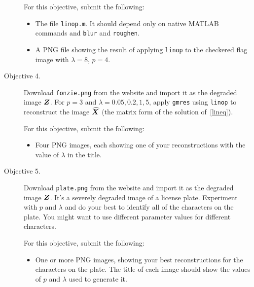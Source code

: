 \documentclass[11pt,letterpaper]{article}
\begin{document}
\begin{description}
For this objective, submit the following:
\begin{itemize}
\item The file \texttt{linop.m}. It should depend only on native MATLAB commands and \texttt{blur} and \texttt{roughen}.
\item A PNG file showing the result of applying \texttt{linop} to the checkered flag image with $\lambda=8$, $p=4$.
\end{itemize}

\item[{Objective 4.}] Download \texttt{fonzie.png} from the website and import it as the degraded image $\bm{Z}$. For $p=3$ and $\lambda=0.05,0.2,1,5$, apply \texttt{gmres} using \texttt{linop} to reconstruct the image $\widehat{\bm{X}}$ (the matrix form of the solution of~\eqref{lineq}).

For this objective, submit the following:
\begin{itemize}
\item Four PNG images, each showing one of your reconstructions with the value of $\lambda$ in the title.
\end{itemize}


\item[Objective 5.] Download \texttt{plate.png} from the website and import it as the degraded image $\bm{Z}$. It's a severely degraded image of a license plate. Experiment with $p$ and $\lambda$ and do your best to identify all of the characters on the plate. You might want to use different parameter values for different characters.

For this objective, submit the following:
\begin{itemize}
\item One or more PNG images, showing your best reconstructions for the characters on the plate. The title of each image should show the values of $p$ and $\lambda$ used to generate it.
\end{itemize}

\end{description}
\end{document}
